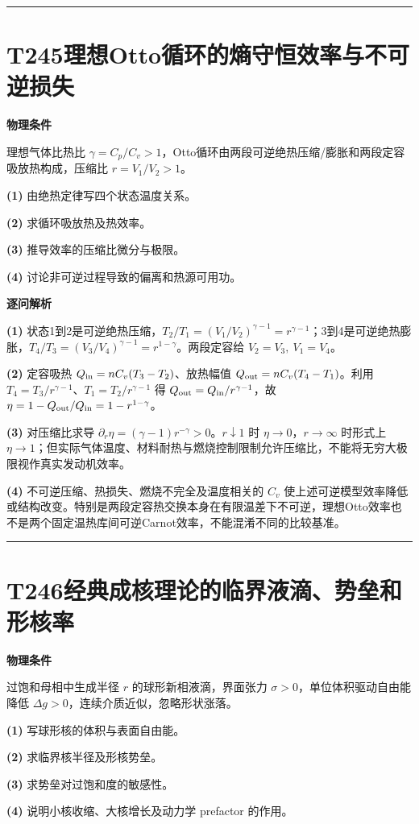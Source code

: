 \documentclass[UTF8,a4paper,11pt,oneside,openany]{ctexbook}
\begin{document}
\par\bigskip\hrule\bigskip
\section*{T245\quad 理想Otto循环的熵守恒效率与不可逆损失}
\textbf{物理条件}\par 理想气体比热比 \(\gamma=C_p/C_v>1\)，Otto循环由两段可逆绝热压缩/膨胀和两段定容吸放热构成，压缩比 \(r=V_1/V_2>1\)。
\par\noindent\textbf{(1)} 由绝热定律写四个状态温度关系。
\par\noindent\textbf{(2)} 求循环吸放热及热效率。
\par\noindent\textbf{(3)} 推导效率的压缩比微分与极限。
\par\noindent\textbf{(4)} 讨论非可逆过程导致的偏离和热源可用功。

\par\medskip\noindent\textbf{逐问解析}
\par\noindent\textbf{(1)} 状态1到2是可逆绝热压缩，\(T_2/T_1=(V_1/V_2)^{\gamma-1}=r^{\gamma-1}\)；3到4是可逆绝热膨胀，\(T_4/T_3=(V_3/V_4)^{\gamma-1}=r^{1-\gamma}\)。两段定容给 \(V_2=V_3,\ V_1=V_4\)。
\par\noindent\textbf{(2)} 定容吸热 \(Q_{\rm in}=nC_v(T_3-T_2)\)、放热幅值 \(Q_{\rm out}=nC_v(T_4-T_1)\)。利用 \(T_4=T_3/r^{\gamma-1}\)、\(T_1=T_2/r^{\gamma-1}\) 得 \(Q_{\rm out}=Q_{\rm in}/r^{\gamma-1}\)，故 \(\eta=1-Q_{\rm out}/Q_{\rm in}=1-r^{1-\gamma}\)。
\par\noindent\textbf{(3)} 对压缩比求导 \(\partial_r\eta=(\gamma-1)r^{-\gamma}>0\)。\(r\downarrow1\) 时 \(\eta\to0\)，\(r\to\infty\) 时形式上 \(\eta\to1\)；但实际气体温度、材料耐热与燃烧控制限制允许压缩比，不能将无穷大极限视作真实发动机效率。
\par\noindent\textbf{(4)} 不可逆压缩、热损失、燃烧不完全及温度相关的 \(C_v\) 使上述可逆模型效率降低或结构改变。特别是两段定容热交换本身在有限温差下不可逆，理想Otto效率也不是两个固定温热库间可逆Carnot效率，不能混淆不同的比较基准。

\par\bigskip\hrule\bigskip
\section*{T246\quad 经典成核理论的临界液滴、势垒和形核率}
\textbf{物理条件}\par 过饱和母相中生成半径 \(r\) 的球形新相液滴，界面张力 \(\sigma>0\)，单位体积驱动自由能降低 \(\Delta g>0\)，连续介质近似，忽略形状涨落。
\par\noindent\textbf{(1)} 写球形核的体积与表面自由能。
\par\noindent\textbf{(2)} 求临界核半径及形核势垒。
\par\noindent\textbf{(3)} 求势垒对过饱和度的敏感性。
\par\noindent\textbf{(4)} 说明小核收缩、大核增长及动力学 prefactor 的作用。
\end{document}
